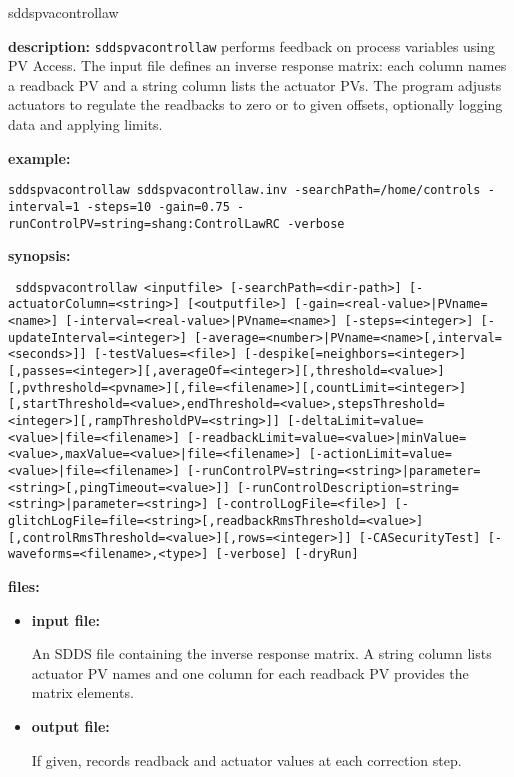 %
\begin{sddsprog}{sddspvacontrollaw}
\item \textbf{description:}
\verb+sddspvacontrollaw+ performs feedback on process variables using PV Access. The
input file defines an inverse response matrix: each column names a readback PV and a
string column lists the actuator PVs. The program adjusts actuators to regulate the
readbacks to zero or to given offsets, optionally logging data and applying limits.

\item \textbf{example:}
\begin{flushleft}{\tt sddspvacontrollaw sddspvacontrollaw.inv -searchPath=/home/controls -interval=1 -steps=10 -gain=0.75 -runControlPV=string=shang:ControlLawRC -verbose}\end{flushleft}

\item \textbf{synopsis:}
\begin{flushleft}{\tt
sddspvacontrollaw <inputfile> [-searchPath=<dir-path>] [-actuatorColumn=<string>] [<outputfile>]\
[-gain={<real-value>|PVname=<name>}] [-interval={<real-value>|PVname=<name>}] [-steps=<integer>]\
[-updateInterval=<integer>] [-average={<number>|PVname=<name>}[,interval=<seconds>]]\
[-testValues=<file>]\
[-despike[=neighbors=<integer>][,passes=<integer>][,averageOf=<integer>][,threshold=<value>][,pvthreshold=<pvname>][,file=<filename>][,countLimit=<integer>][,startThreshold=<value>,endThreshold=<value>,stepsThreshold=<integer>][,rampThresholdPV=<string>]]\
[-deltaLimit={value=<value>|file=<filename>}]\
[-readbackLimit={value=<value>|minValue=<value>,maxValue=<value>|file=<filename>}]\
[-actionLimit={value=<value>|file=<filename>}]\
[-runControlPV={string=<string>|parameter=<string>}[,pingTimeout=<value>]]\
[-runControlDescription={string=<string>|parameter=<string>}] [-controlLogFile=<file>]\
[-glitchLogFile=file=<string>[,readbackRmsThreshold=<value>][,controlRmsThreshold=<value>][,rows=<integer>]]\
[-CASecurityTest] [-waveforms=<filename>,<type>] [-verbose] [-dryRun]}
\end{flushleft}

\item \textbf{files:}
  \begin{itemize}
  \item \textbf{input file:} \par
    An SDDS file containing the inverse response matrix. A string column lists actuator PV names and one column for each readback PV provides the matrix elements.
  \item \textbf{output file:} \par
    If given, records readback and actuator values at each correction step.
  \end{itemize}


\end{sddsprog}
